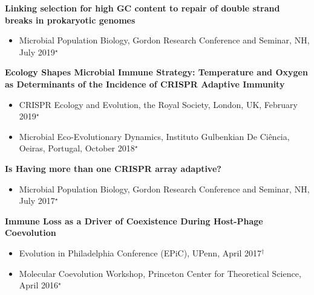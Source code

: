 \documentclass[]{res}
\begin{document}
\begin{resume}
{\bf Linking selection for high GC content to repair of double strand breaks in prokaryotic genomes}
 \begin{itemize}
 \item Microbial Population Biology, Gordon Research Conference and Seminar, NH, July 2019$^{\star}$
 \end{itemize} 
 
{\bf Ecology Shapes Microbial Immune Strategy: Temperature and Oxygen as Determinants of the Incidence of CRISPR Adaptive Immunity} 
 \begin{itemize}
 \item CRISPR Ecology and Evolution, the Royal Society, London, UK, February 2019$^{\star}$
 \item Microbial Eco-Evolutionary Dynamics, Instituto Gulbenkian De Ci\^{e}ncia, Oeiras, Portugal, October 2018$^{\star}$
 \end{itemize}
 
 {\bf Is Having more than one CRISPR array adaptive?}
 \begin{itemize}
 \item Microbial Population Biology, Gordon Research Conference and Seminar, NH, July 2017$^{\star}$
 \end{itemize}
 
  {\bf Immune Loss as a Driver of Coexistence During Host-Phage Coevolution}
 \begin{itemize}
 \item Evolution in Philadelphia Conference (EPiC), UPenn, April 2017$^{\dagger}$
 \item Molecular Coevolution Workshop, Princeton Center for Theoretical Science, April 2016$^{\star}$
 \end{itemize}


\end{resume} 
\end{document}
